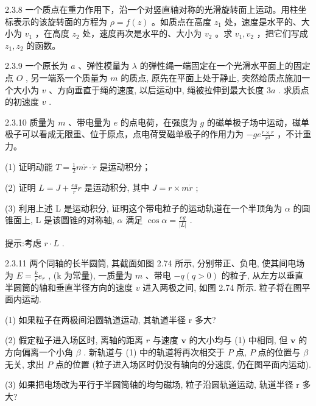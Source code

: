 \begin{problem}{2.3.8}
一个质点在重力作用下，沿一个对竖直轴对称的光滑旋转面上运动。用柱坐标表示的该旋转面的方程为 $\rho = f(z)$ 。如质点在高度 $z_{1}$ 处，速度是水平的、大小为 $v_{1}$ ，在高度 $z_{2}$ 处，速度再次是水平的、大小为 $v_{2}$ 。求 $v_{1}, v_{2}$ ，把它们写成 $z_{1}, z_{2}$ 的函数。
\end{problem}
\clearpage


\begin{problem}{2.3.9}
一个原长为 $a$ 、弹性模量为 $\lambda$ 的弹性绳一端固定在一个光滑水平面上的固定点 $O$ , 另一端系一个质量为 $m$ 的质点, 原先在平面上处于静止, 突然给质点施加一个大小为 $v$ 、方向垂直于绳的速度, 以后运动中, 绳被拉伸到最大长度 $3a$ . 求质点的初速度 $v$ .
\end{problem}
\clearpage


\begin{problem}{2.3.10}
质量为 $m$ 、带电量为 $e$ 的点电荷，在强度为 $g$ 的磁单极子场中运动，磁单极子可以看成无限重、位于原点，点电荷受磁单极子的作用力为 $-ge\frac{\dot{r} \times r}{r^3}$ ，不计重力。

(1) 证明动能 $T=\frac{1}{2}m\dot{r}\cdot\dot{r}$ 是运动积分；

(2) 证明 $L = J + \frac{eg}{r} r$ 是运动积分, 其中 $J = r \times m \dot{r}$ ;

(3) 利用上述 L 是运动积分, 证明这个带电粒子的运动轨道在一个半顶角为 $\alpha$ 的圆锥面上, L 是该圆锥的对称轴, $\alpha$ 满足 $\cos\alpha=\frac{eg}{|L|}$ .

提示:考虑 $r \cdot L$ .
\end{problem}
\clearpage


\begin{problem}{2.3.11}
两个同轴的长半圆筒, 其截面如图 2.74 所示, 分别带正、负电, 使其间电场为 $E = \frac{k}{r} e_r$ , (k 为常量), 一质量为 $m$ 、带电 $-q(q > 0)$ 的粒子, 从左方以垂直半圆筒的轴和垂直半径方向的速度 $v$ 进入两极之间, 如图 2.74 所示. 粒子将在图平面内运动.

(1) 如果粒子在两极间沿圆轨道运动, 其轨道半径 r 多大?

(2) 假定粒子进入场区时, 离轴的距离 $r$ 与速度 $\bm{v}$ 的大小均与 (1) 中相同, 但 $\bm{v}$ 的方向偏离一个小角 $\beta$ . 新轨道与 (1) 中的轨道将再次相交于 $P$ 点, $P$ 点的位置与 $\beta$ 无关, 求出 $P$ 点的位置 (粒子进入场区时仍没有轴向的分速度, 仍在图平面内运动).

(3) 如果把电场改为平行于半圆筒轴的均匀磁场, 粒子沿圆轨道运动, 轨道半径 r 多大?
\begin{center}

\end{center}
\end{problem}
\clearpage


